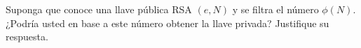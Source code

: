
Suponga que conoce una llave pública RSA $(e,N)$ y se filtra el número $\phi(N)$. ¿Podría usted en base a este número obtener la llave privada? Justifique su respuesta.
